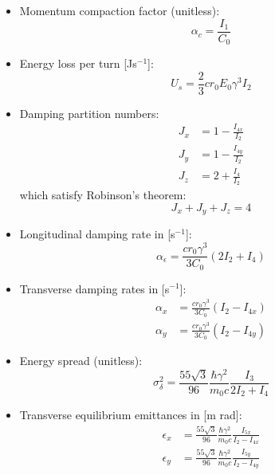 \begin{itemize}
    \item Momentum compaction factor (unitless):
    \begin{equation}
        \alpha_c = \frac{I_1}{C_0}
    \end{equation}

    \item Energy loss per turn [Js$^{-1}$]:
    \begin{equation}
        U_s = \frac{2}{3} c r_0 E_0 \gamma^3 I_2
    \end{equation}

    \item Damping partition numbers:
    \begin{align}
        J_x &= 1 - \frac{I_{4x}}{I_2}\\
        J_y &= 1 - \frac{I_{4y}}{I_2}\\
        J_z &= 2 + \frac{I_4}{I_2}
    \end{align}
    which satisfy Robinson's theorem:
    \begin{equation}
        J_x + J_y + J_z = 4
    \end{equation}

    \item Longitudinal damping rate in [s$^{-1}$]:
    \begin{equation}
        \alpha_\epsilon = \frac{c r_0 \gamma^3}{3 C_0} (2I_2 + I_4)
    \end{equation}

    \item Transverse damping rates in [s$^{-1}$]:
    \begin{align}
        \alpha_x &= \frac{c r_0 \gamma^3}{3C_0} (I_2 - I_{4x})\\
        \alpha_y &= \frac{c r_0 \gamma^3}{3C_0} (I_2 - I_{4y})
    \end{align}

    \item Energy spread (unitless):
    \begin{equation}
        \sigma_\delta^2 = \frac{55 \sqrt{3}}{96} \frac{\hbar \gamma^2}{m_0 c} \frac{I_3}{2I_2 + I_4}
    \end{equation}

    \item Transverse equilibrium emittances in [m rad]:
    \begin{align}
        {\epsilon_x} &= \frac{55 \sqrt{3}}{96} \frac{\hbar \gamma^2}{m_0 c} \frac{I_{5x}}{I_2 - I_{4x}}\\
        {\epsilon_y} &= \frac{55 \sqrt{3}}{96} \frac{\hbar \gamma^2}{m_0 c} \frac{I_{5y}}{I_2 - I_{4y}}
    \end{align}


\end{itemize}

